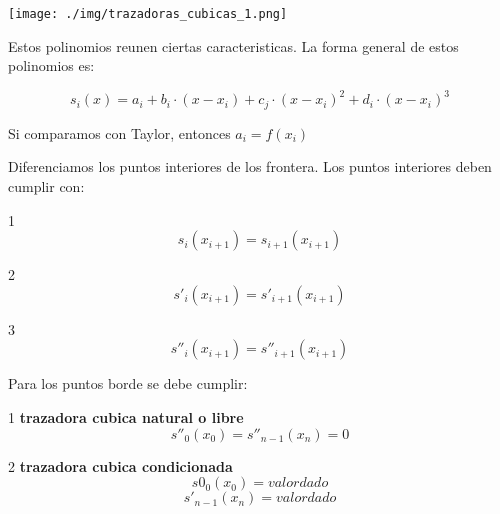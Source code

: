 \documentclass[10pt]{article}
\begin{document}
\texttt{[image: ./img/trazadoras\_cubicas\_1.png]}

Estos polinomios reunen ciertas caracteristicas. La forma general de estos polinomios es:

\begin{equation}
	s_i(x) = a_i + b_i \cdot (x-x_i) + c_j \cdot (x-x_i)^2 + d_i \cdot (x-x_i)^3
\end{equation}

Si comparamos con Taylor, entonces $a_i = f(x_i)$

Diferenciamos los puntos interiores de los frontera. Los puntos interiores deben cumplir con:

1
\begin{equation}
	s_i(x_{i+1}) = s_{i+1}(x_{i+1})
\end{equation}

2
\begin{equation}
	s'_i(x_{i+1}) = s'_{i+1}(x_{i+1})
\end{equation}

3
\begin{equation}
	s''_i(x_{i+1}) = s''_{i+1}(x_{i+1})
\end{equation}

Para los puntos borde se debe cumplir:

1 \textbf{trazadora cubica natural o libre}
\begin{equation}
	s''_0(x_0) = s''_{n-1}(x_n) = 0	
\end{equation}

2 \textbf{trazadora cubica condicionada}
\begin{equation}
	s0_0(x_0) = valor dado
\end{equation}
\begin{equation}
	s'_{n-1}(x_n) = valor dado
\end{equation}
\end{document}
